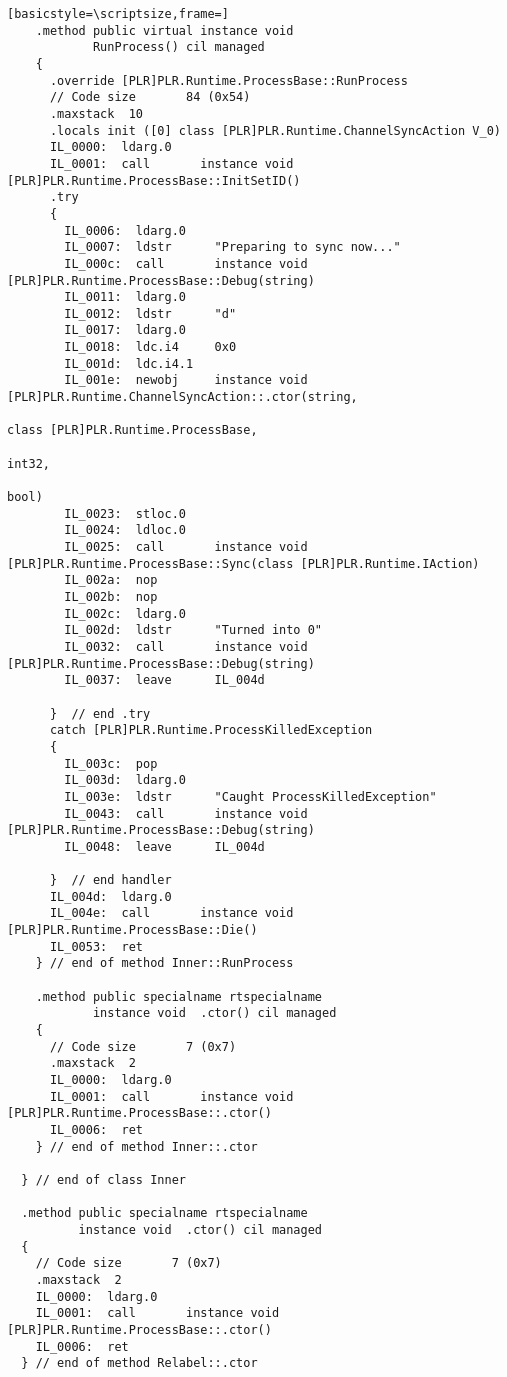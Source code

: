\begin{lstlisting}[basicstyle=\scriptsize,frame=]
    .method public virtual instance void 
            RunProcess() cil managed
    {
      .override [PLR]PLR.Runtime.ProcessBase::RunProcess
      // Code size       84 (0x54)
      .maxstack  10
      .locals init ([0] class [PLR]PLR.Runtime.ChannelSyncAction V_0)
      IL_0000:  ldarg.0
      IL_0001:  call       instance void [PLR]PLR.Runtime.ProcessBase::InitSetID()
      .try
      {
        IL_0006:  ldarg.0
        IL_0007:  ldstr      "Preparing to sync now..."
        IL_000c:  call       instance void [PLR]PLR.Runtime.ProcessBase::Debug(string)
        IL_0011:  ldarg.0
        IL_0012:  ldstr      "d"
        IL_0017:  ldarg.0
        IL_0018:  ldc.i4     0x0
        IL_001d:  ldc.i4.1
        IL_001e:  newobj     instance void [PLR]PLR.Runtime.ChannelSyncAction::.ctor(string,
                                                                                     class [PLR]PLR.Runtime.ProcessBase,
                                                                                     int32,
                                                                                     bool)
        IL_0023:  stloc.0
        IL_0024:  ldloc.0
        IL_0025:  call       instance void [PLR]PLR.Runtime.ProcessBase::Sync(class [PLR]PLR.Runtime.IAction)
        IL_002a:  nop
        IL_002b:  nop
        IL_002c:  ldarg.0
        IL_002d:  ldstr      "Turned into 0"
        IL_0032:  call       instance void [PLR]PLR.Runtime.ProcessBase::Debug(string)
        IL_0037:  leave      IL_004d

      }  // end .try
      catch [PLR]PLR.Runtime.ProcessKilledException 
      {
        IL_003c:  pop
        IL_003d:  ldarg.0
        IL_003e:  ldstr      "Caught ProcessKilledException"
        IL_0043:  call       instance void [PLR]PLR.Runtime.ProcessBase::Debug(string)
        IL_0048:  leave      IL_004d

      }  // end handler
      IL_004d:  ldarg.0
      IL_004e:  call       instance void [PLR]PLR.Runtime.ProcessBase::Die()
      IL_0053:  ret
    } // end of method Inner::RunProcess

    .method public specialname rtspecialname 
            instance void  .ctor() cil managed
    {
      // Code size       7 (0x7)
      .maxstack  2
      IL_0000:  ldarg.0
      IL_0001:  call       instance void [PLR]PLR.Runtime.ProcessBase::.ctor()
      IL_0006:  ret
    } // end of method Inner::.ctor

  } // end of class Inner

  .method public specialname rtspecialname 
          instance void  .ctor() cil managed
  {
    // Code size       7 (0x7)
    .maxstack  2
    IL_0000:  ldarg.0
    IL_0001:  call       instance void [PLR]PLR.Runtime.ProcessBase::.ctor()
    IL_0006:  ret
  } // end of method Relabel::.ctor


\end{lstlisting}
